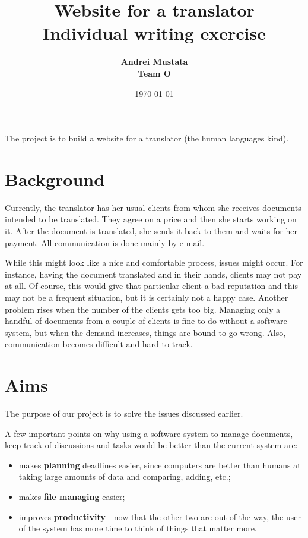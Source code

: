 \documentclass{article}
\title{Website for a translator\\ \vspace{4mm} 
Individual writing exercise}
\author{\bf Andrei Mustata\\ \bf Team O}
\date{\today}
\begin{document}
\maketitle

The project is to build a website for a translator (the human languages kind).

\section*{Background}

Currently, the translator has her usual clients from whom she receives documents
intended to be translated. They agree on a price and then she starts working
on it. After the document is translated, she sends it back to them and waits
for her payment. All communication is done mainly by e-mail.

While this might look like a nice and comfortable process, issues might occur.
For instance, having the document translated and in their hands, clients may
not pay at all. Of course, this would give that particular client a bad
reputation and this may not be a frequent situation, but it is certainly not
a happy case. Another problem rises when the number of the clients gets too
big. Managing only a handful of documents from a couple of clients is fine
to do without a software system, but when the demand increases, things are
bound to go wrong. Also, communication becomes difficult and hard to track.


\section*{Aims}

The purpose of our project is to solve the issues discussed earlier.

A few important points on why using a software system to manage documents,
keep track of discussions and tasks would be better than the current system
are:
\begin{itemize}
	\item
	makes {\bf planning} deadlines easier, since computers are better than humans
	at taking large amounts of data and comparing, adding, etc.;
	\item
	makes {\bf file managing} easier;
	\item
	improves {\bf productivity} - now that the other two are out of the way, the
	user of the system has more time to think of things that matter more.
\end{itemize}
\end{document}
